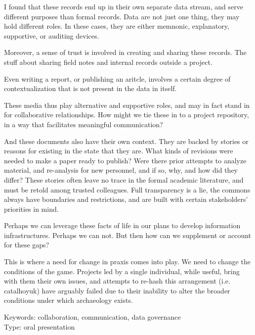 \documentclass[a4paper]{article}
\begin{document}
I found that these records end up in their own separate data stream, and serve different purposes than formal records. Data are not just one thing, they may hold different roles. In these cases, they are either memnonic, explanatory, supportive, or auditing devices.

Moreover, a sense of trust is involved in creating and sharing these records. The stuff about sharing field notes and internal records outside a project.

Even writing a report, or publishing an aritcle, involves a certain degree of contextualization that is not present in the data in itself.

These media thus play alternative and supportive roles, and may in fact stand in for collaborative relationships. How might we tie these in to a project repository, in a way that facilitates meaningful communication?

And these documents also have their own context. They are backed by stories or reasons for existing in the state that they are. What kinds of revisions were needed to make a paper ready to publish? Were there prior attempts to analyze material, and re-analysis for new personnel, and if so, why, and how did they differ? These stories often leave no trace in the formal academic literature, and must be retold among trusted colleagues. Full transparency is a lie, the commons always have boundaries and restrictions, and are built with certain stakeholders' priorities in mind.

Perhaps we can leverage these facts of life in our plans to develop information infrastructures. Perhaps we can not. But then how can we supplement or account for these gaps?

This is where a need for change in praxis comes into play. We need to change the conditions of the game. Projects led by a single individual, while useful, bring with them their own issues, and attempts to re-hash this arrangement (i.e. catalhoyuk) have arguably failed due to their inability to alter the broader conditions under which archaeology exists.




\hspace{10pt}

\normalsize
\noindent
Keywords: collaboration, communication, data governance\\
Type: oral presentation

\printbibliography
\end{document}
